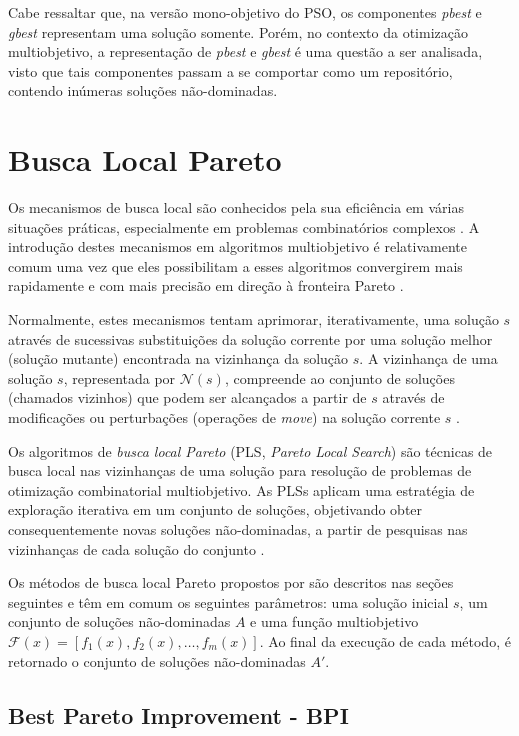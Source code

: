 \documentclass[
	12pt,				%
	openany,			%
	oneside,	
	a4paper,			%
	brazil,				%
	]{unimontes-ppgmsc-abntex2}
\begin{document}
Cabe ressaltar que, na versão mono-objetivo do PSO, os componentes {\em pbest} e {\em gbest} representam uma solução somente. Porém, no contexto da otimização multiobjetivo, a representação de {\em pbest} e {\em gbest} é uma questão a ser analisada, visto que tais componentes passam a se comportar como um repositório, contendo inúmeras soluções não-dominadas.

\section{Busca Local Pareto}
\label{sec:busca_local_pareto}

Os mecanismos de busca local são conhecidos pela sua eficiência em várias situações práticas, especialmente em problemas combinatórios complexos \cite{Basseur_2007}. A introdução destes mecanismos em algoritmos multiobjetivo é relativamente comum uma vez que eles possibilitam a esses algoritmos convergirem mais rapidamente e com mais precisão em direção à fronteira Pareto \cite{Joao_2013}.

Normalmente, estes mecanismos tentam aprimorar, iterativamente, uma solução $s$ através de sucessivas substituições da solução corrente por uma solução melhor (solução mutante) encontrada na vizinhança da solução $s$. A vizinhança de uma solução $s$, representada por $\mathcal{N}(s)$, compreende ao conjunto de soluções (chamados vizinhos) que podem ser alcançados a partir de $s$ através de modificações ou perturbações (operações de {\em move}) na solução corrente $s$ \cite{Zachariadis_2010}.

Os algoritmos de {\em busca local Pareto} (PLS, {\em Pareto Local Search}) são técnicas de busca local nas vizinhanças de uma solução para resolução de problemas de otimização combinatorial multiobjetivo. As PLSs aplicam uma estratégia de exploração iterativa em um conjunto de soluções, objetivando obter consequentemente novas soluções não-dominadas, a partir de pesquisas nas vizinhanças de cada solução do conjunto \cite{Drugan_2012}. 

Os métodos de busca local Pareto propostos por   são descritos nas seções seguintes e têm em comum os seguintes parâmetros: uma solução inicial $s$, um conjunto de soluções não-dominadas $A$ e uma função multiobjetivo $\mathcal{F}(x)=[f_1(x), f_2(x), \dots, f_m(x)]$. Ao final da execução de cada método, é retornado o conjunto de soluções não-dominadas $A'$.

\subsection{Best Pareto Improvement - BPI} 
\end{document}
